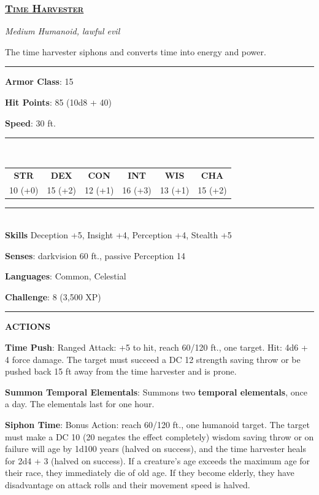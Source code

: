 \subsubsection*{\underline{\textsc{\Large Time Harvester}}}
\noindent\emph{Medium Humanoid, lawful evil}

The time harvester siphons and converts time into energy and power.

\noindent\rule{0.5\textwidth}{0.5pt}

\noindent\textbf{Armor Class}: 15

\noindent\textbf{Hit Points}: 85 (10d8 + 40)

\noindent\textbf{Speed}: 30 ft.

\noindent\rule{0.5\textwidth}{0.5pt} \\
\begin{table}[H]
	\begin{tabular}{cccccc}
		\textbf{STR} & \textbf{DEX} & \textbf{CON} & \textbf{INT} & \textbf{WIS} & \textbf{CHA} \\
		10 (+0) & 15 (+2) & 12 (+1) & 16 (+3) & 13 (+1) & 15 (+2) \\
	\end{tabular}
\end{table}
\noindent\rule{0.5\textwidth}{0.5pt} \\

\noindent\textbf{Skills} Deception +5, Insight +4, Perception +4, Stealth +5

\noindent\textbf{Senses}: darkvision 60 ft., passive Perception 14

\noindent\textbf{Languages}: Common, Celestial

\noindent\textbf{Challenge}: 8 (3,500 XP)

\noindent\rule{0.5\textwidth}{0.5pt}

\noindent\textbf{ACTIONS}

\noindent\textbf{Time Push}: Ranged Attack: +5 to hit, reach 60/120 ft., one target. Hit: 4d6 + 4 force damage. The target must succeed a DC 12 strength saving throw or be pushed back 15 ft away from the time harvester and is prone. 

\noindent\textbf{Summon Temporal Elementals}: Summons two \textbf{temporal elementals}, once a day. The elementals last for one hour.

\noindent\textbf{Siphon Time}: Bonus Action: reach 60/120 ft., one humanoid target. The target must make a DC 10 (20 negates the effect completely) wisdom saving throw or on failure will age by 1d100 years (halved on success), and the time harvester heals for 2d4 + 3 (halved on success). If a creature's age exceeds the maximum age for their race, they immediately die of old age. If they become elderly, they have disadvantage on attack rolls and their movement speed is halved.

